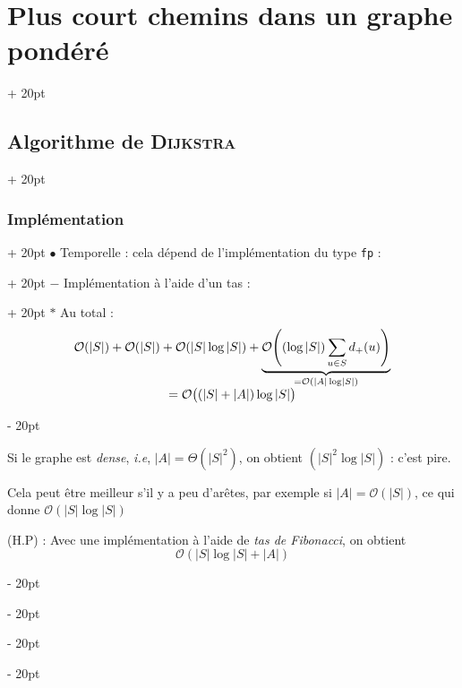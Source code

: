 \documentclass[a4paper, 12pt, twoside]{article}
\newcommand{\lr}[1]{\left( #1 \right)}
\newcommand{\abs}[1]{\left\lvert #1 \right\rvert}
\newcommand{\ind}[1][20pt]{\advance\leftskip + #1}
\newcommand{\deind}[1][20pt]{\advance\leftskip - #1}
\newenvironment{indt}[2][20pt]{#2 \par \ind[#1]}{\par \deind} %
\begin{document}
\begin{indt}{\section{Plus court chemins dans un graphe pondéré}}
\begin{indt}{\subsection{Algorithme de \textsc{Dijkstra}}}
\begin{indt}{\subsubsection{Implémentation}}
\begin{indt}{$\bullet$ Temporelle : cela dépend de l'implémentation du type \texttt{fp} :}
\begin{indt}{$-$ Implémentation à l'aide d'un tas :}
                        $*$ Au total :
                        \[
                            \begin{array}{c}
                                \mathcal O(\abs S)
                                + \mathcal O(\abs S)
                                + \mathcal O(\abs S \log \abs S)
                                + \underbrace{\mathcal O\!\lr{(\log \abs S) \sum_{u \in S} d_+(u)}}_{= \mathcal O(\abs A \log \abs S)}
                                \\
                                =
                                \mathcal O\!\lr{ \vphantom{\frac a a} (\abs S + \abs A) \log\abs S}
                            \end{array}
                        \]
                    \end{indt}

                    \vspace{12pt}
                    
                    Si le graphe est \textit{dense}, \textit{i.e}, $\abs A = \Theta\!\lr{\abs S ^2}$, on obtient $\mathcal\!\lr{\abs S^2 \log \abs S}$ : c'est pire.

                    Cela peut être meilleur s'il y a peu d'arêtes, par exemple si $\abs A = \mathcal O(\abs S)$, ce qui donne $\mathcal O(\abs S \log \abs S)$

                    (H.P) : Avec une implémentation à l'aide de \textit{tas de Fibonacci}, on obtient
                    \[
                        \mathcal O\!\lr{\abs S \log \abs S + \abs A}
                    \]
                \end{indt}
            \end{indt}
        \end{indt}
    \end{indt}
    
    
    
\end{document}
